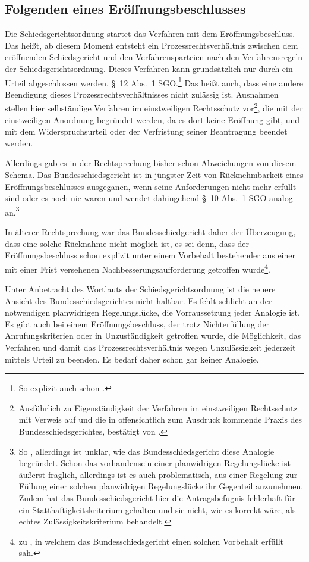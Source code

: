 \subsection{Folgenden eines Eröffnungsbeschlusses}
Die Schiedsgerichtsordnung startet das Verfahren mit dem Eröffnungsbeschluss.
Das heißt, ab diesem Moment entsteht ein Prozessrechtsverhältnis zwischen dem eröffnenden Schiedsgericht und den Verfahrensparteien nach den Verfahrensregeln der Schiedsgerichtsordnung.
Dieses Verfahren kann grundsätzlich nur durch ein Urteil abgeschlossen werden, \S~12 Abs.~1 SGO.\footnote{So explizit auch schon \cite[S.~2]{BSG20131204}.}
Das heißt auch, dass eine andere Beendigung dieses Prozessrechtsverhältnisses nicht zulässig ist.
Ausnahmen stellen hier selbständige Verfahren im einstweiligen Rechtsschutz vor\footnote{Ausführlich zu Eigenständigkeit der Verfahren im einstweiligen Rechtsschutz \cite[S.~3]{LSGBB145} mit Verweis auf \cites[S.~4]{LSGHE20140423II} und die in \cites{BSG41114ES}{BSG3314EA} offensichtlich zum Ausdruck kommende Praxis des Bundesschiedsgerichtes, bestätigt von \cite[S.~2~f.]{BSG4214ESWiderspruch}.}, die mit der einstweiligen Anordnung begründet werden, da es dort keine Eröffnung gibt, und mit dem Widerspruchsurteil oder der Verfristung seiner Beantragung beendet werden.

Allerdings gab es in der Rechtsprechung bisher schon Abweichungen von diesem Schema.
Das Bundesschiedsgericht ist in jüngster Zeit von Rücknehmbarkeit eines Eröffnungsbeschlusses ausgeganen, wenn seine Anforderungen nicht mehr erfüllt sind oder es noch nie waren und wendet dahingehend \S~10 Abs.~1 SGO analog an.\footnote{So \cite{BSGPP100127862}, allerdings ist unklar, wie das Bundesschiedsgericht diese Analogie begründet. Schon das vorhandensein einer planwidrigen Regelungslücke ist äußerst fraglich, allerdings ist es auch problematisch, aus einer Regelung zur Füllung einer solchen planwidrigen Regelungslücke ihr Gegenteil anzunehmen. Zudem hat das Bundesschiedsgericht hier die Antragsbefugnis fehlerhaft für ein Statthaftigkeitskriterium gehalten und sie nicht, wie es korrekt wäre, als echtes Zulässigkeitskriterium behandelt.}

In älterer Rechtsprechung war das Bundesschiedgericht daher der Überzeugung, dass eine solche Rücknahme nicht möglich ist, es sei denn, dass der Eröffnungsbeschluss schon explizit unter einem Vorbehalt bestehender aus einer mit einer Frist versehenen Nachbesserungsaufforderung getroffen wurde\footnote{\cite[S.~2]{BSG20130715} zu \cite{LSGNRW2013011}, in welchem das Bundesschiedsgericht einen solchen Vorbehalt erfüllt sah.}.

Unter Anbetracht des Wortlauts der Schiedsgerichtsordnung ist die neuere Ansicht des Bundesschiedsgerichtes nicht haltbar.
Es fehlt schlicht an der notwendigen planwidrigen Regelungslücke, die Vorraussetzung jeder Analogie ist.
Es gibt auch bei einem Eröffnungsbeschluss, der trotz Nichterfüllung der Anrufungskriterien oder in Unzuständigkeit getroffen wurde, die Möglichkeit, das Verfahren und damit das Prozessrechtsverhältnis wegen Unzulässigkeit jederzeit mittels Urteil zu beenden.
Es bedarf daher schon gar keiner Analogie.

\chapterbib
